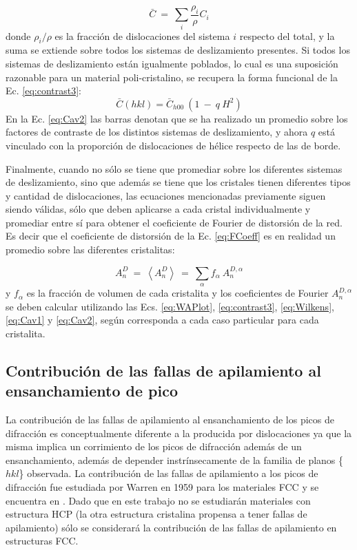 \begin{equation}
  \bar{C} \ = \ \sum_i \frac{\rho_i}{\rho} C_i
  \label{eq:Cav1}
\end{equation}
\noindent
donde $\rho_i/\rho$ es la fracción de dislocaciones del sistema $i$ respecto del total, y la suma se extiende sobre todos los sistemas de deslizamiento presentes.
Si todos los sistemas de deslizamiento están igualmente poblados, lo cual es una suposición razonable para un material poli-cristalino, se recupera la forma funcional de la Ec. \ref{eq:contrast3}:
\begin{equation}
  \bar{C}(hkl) = \bar{C}_{h00}\ (1 \ - \ q\ H^2)
  \label{eq:Cav2}
\end{equation}
\noindent
En la Ec. \ref{eq:Cav2} las barras denotan que se ha realizado un promedio sobre los factores de contraste de los distintos sistemas de deslizamiento, y ahora $q$ está vinculado con la proporción de dislocaciones de hélice respecto de las de borde.

Finalmente, cuando no sólo se tiene que promediar sobre los diferentes sistemas de deslizamiento, sino que además se tiene que los cristales tienen diferentes tipos y cantidad de dislocaciones, las ecuaciones mencionadas previamente siguen siendo válidas, sólo que deben aplicarse a cada cristal individualmente y promediar entre sí para obtener el coeficiente de Fourier de distorsión de la red. Es decir que el coeficiente de distorsión de la Ec. \ref{eq:FCoeff} es en realidad un promedio sobre las diferentes cristalitas:

\begin{equation}
  A_n^D \ = \ \left< A_n^D \right> \ = \ \sum_{\alpha} f_{\alpha} \ A_{n}^{D,\alpha}
  \label{eq:FCoeffAv}
\end{equation}
\noindent
y $f_{\alpha}$ es la fracción de volumen de cada cristalita y los coeficientes de Fourier $A_{n}^{D,\alpha}$ se deben calcular utilizando las Ecs. \ref{eq:WAPlot}, \ref{eq:contrast3}, \ref{eq:Wilkens}, \ref{eq:Cav1} y \ref{eq:Cav2}, según corresponda a cada caso particular para cada cristalita.

\subsection{Contribución de las fallas de apilamiento al ensanchamiento de pico}\label{SS:Twin}
La contribución de las fallas de apilamiento al ensanchamiento de los picos de difracción es conceptualmente diferente a la producida por dislocaciones ya que la misma implica un corrimiento de los picos de difracción además de un ensanchamiento, además de depender instrínsecamente de la familia de planos \{$hkl$\} observada.
La contribución de las fallas de apilamiento a los picos de difracción fue estudiada por Warren en 1959 para los materiales FCC y se encuentra en \cite{Warren1959147}.
Dado que en este trabajo no se estudiarán materiales con estructura HCP (la otra estructura cristalina propensa a tener fallas de apilamiento) sólo se considerará la contribución de las fallas de apilamiento en estructuras FCC.

